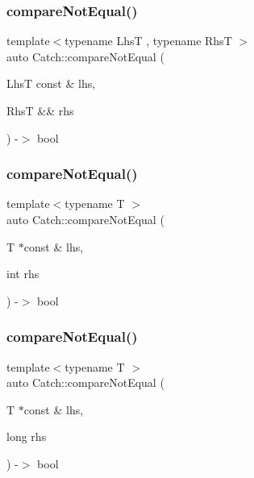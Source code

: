 \mbox{\label{namespace_catch_a8bec217f5ef5f09c17074c311c958f3c}} 
\subsubsection{\texorpdfstring{compareNotEqual()}{compareNotEqual()}\hspace{0.1cm}{\footnotesize\ttfamily [1/5]}}
{\footnotesize\ttfamily template$<$typename LhsT , typename RhsT $>$ \\
auto Catch\+::compare\+Not\+Equal (\begin{DoxyParamCaption}\item[{LhsT const \&}]{lhs,  }\item[{RhsT \&\&}]{rhs }\end{DoxyParamCaption}) -\/$>$ bool }

\mbox{\label{namespace_catch_aa81c95898f22dce1f61d7710e495d1ee}} 
\subsubsection{\texorpdfstring{compareNotEqual()}{compareNotEqual()}\hspace{0.1cm}{\footnotesize\ttfamily [2/5]}}
{\footnotesize\ttfamily template$<$typename T $>$ \\
auto Catch\+::compare\+Not\+Equal (\begin{DoxyParamCaption}\item[{T $\ast$const \&}]{lhs,  }\item[{int}]{rhs }\end{DoxyParamCaption}) -\/$>$ bool }

\mbox{\label{namespace_catch_adad6539b3780b9a8953221efd038e2e4}} 
\subsubsection{\texorpdfstring{compareNotEqual()}{compareNotEqual()}\hspace{0.1cm}{\footnotesize\ttfamily [3/5]}}
{\footnotesize\ttfamily template$<$typename T $>$ \\
auto Catch\+::compare\+Not\+Equal (\begin{DoxyParamCaption}\item[{T $\ast$const \&}]{lhs,  }\item[{long}]{rhs }\end{DoxyParamCaption}) -\/$>$ bool }

